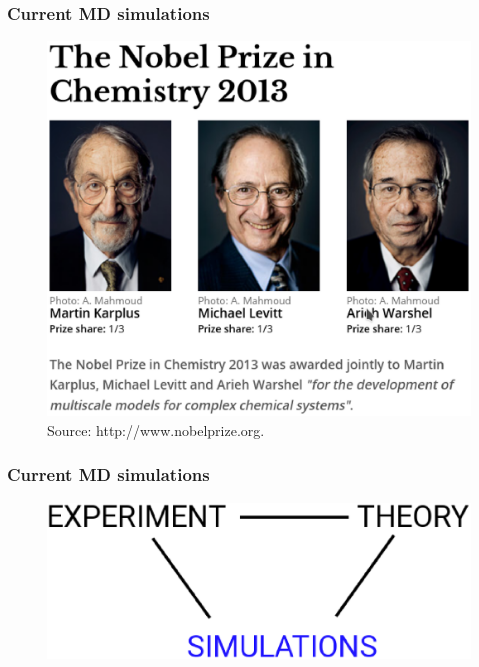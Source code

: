 \documentclass{beamer}
\begin{document}
\begin{frame}\frametitle{Current MD simulations}

\begin{figure}
\includegraphics[scale=0.33]{nobel_prize.eps}
\caption{{\scriptsize Source: http://www.nobelprize.org.}}
\end{figure}

\end{frame}



\begin{frame}\frametitle{Current MD simulations}

\begin{figure}
\includegraphics[scale=0.39]{three_approaches.eps}
\end{figure}

\end{frame}
\end{document}
